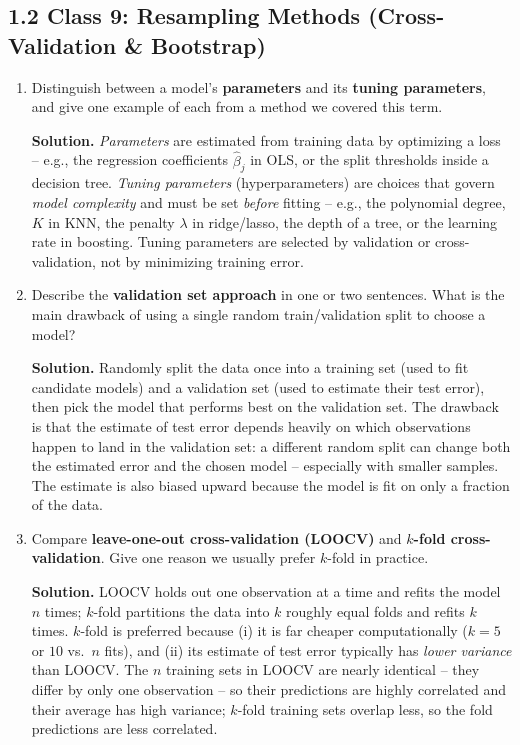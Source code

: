 \documentclass[11pt]{article}
\newcommand{\solution}[1]{%
  \par\medskip\noindent\textbf{Solution.} #1\par\medskip
}
\begin{document}
\subsection*{1.2 Class 9: Resampling Methods (Cross-Validation \& Bootstrap)}

\begin{enumerate}[leftmargin=*, resume]

\item Distinguish between a model's \textbf{parameters} and its \textbf{tuning parameters}, and give one example of each from a method we covered this term.

\solution{\emph{Parameters} are estimated from training data by optimizing a loss -- e.g., the regression coefficients $\hat\beta_j$ in OLS, or the split thresholds inside a decision tree. \emph{Tuning parameters} (hyperparameters) are choices that govern \emph{model complexity} and must be set \emph{before} fitting -- e.g., the polynomial degree, $K$ in KNN, the penalty $\lambda$ in ridge/lasso, the depth of a tree, or the learning rate in boosting. Tuning parameters are selected by validation or cross-validation, not by minimizing training error.}

\item Describe the \textbf{validation set approach} in one or two sentences. What is the main drawback of using a single random train/validation split to choose a model?

\solution{Randomly split the data once into a training set (used to fit candidate models) and a validation set (used to estimate their test error), then pick the model that performs best on the validation set. The drawback is that the estimate of test error depends heavily on which observations happen to land in the validation set: a different random split can change both the estimated error and the chosen model -- especially with smaller samples. The estimate is also biased upward because the model is fit on only a fraction of the data.}

\item Compare \textbf{leave-one-out cross-validation (LOOCV)} and \textbf{$k$-fold cross-validation}. Give one reason we usually prefer $k$-fold in practice.

\solution{LOOCV holds out one observation at a time and refits the model $n$ times; $k$-fold partitions the data into $k$ roughly equal folds and refits $k$ times. $k$-fold is preferred because (i) it is far cheaper computationally ($k=5$ or $10$ vs.~$n$ fits), and (ii) its estimate of test error typically has \emph{lower variance} than LOOCV. The $n$ training sets in LOOCV are nearly identical -- they differ by only one observation -- so their predictions are highly correlated and their average has high variance; $k$-fold training sets overlap less, so the fold predictions are less correlated.}


\end{enumerate}
\end{document}
